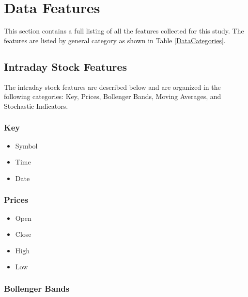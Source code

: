 \documentclass[journal]{IEEEtran}
\begin{document}
\ifCLASSOPTIONcaptionsoff
  \newpage
\fi

\appendices

\section{Data Features}
\label{DataFeatures}

This section contains a full listing of all the features collected for this
 study. The features are listed by general category as shown in 
 Table \ref{DataCategories}.

\subsection{Intraday Stock Features}

The intraday stock features are described below and are organized in the 
 following categories: Key, Prices, Bollenger Bands, Moving Averages, and Stochastic 
 Indicators.

\subsubsection{Key}

\begin{itemize}
	\item Symbol
	\item Time
	\item Date
\end{itemize}

\subsubsection{Prices}

\begin{itemize}
	\item Open
	\item Close
	\item High
	\item Low
\end{itemize}

\subsubsection{Bollenger Bands}
\end{document}
